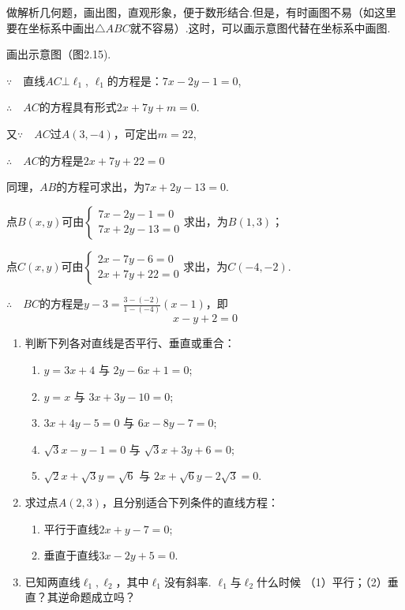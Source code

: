 \begin{analyze}
    做解析几何题，画出图，直观形象，便于数形结合.但是，有时画图不易（如这里要在坐标系中画出$\triangle ABC$就不容易）.这时，可以画示意图代替在坐标系中画图.
\end{analyze}

\begin{solution}
    画出示意图（图2.15).

$\because\quad $直线$AC\bot \ell_1$, $\ell_1$的方程是：$7x-2y-1=0$,

$\therefore\quad AC$的方程具有形式$2x+7y+m=0$.

又$\because\quad AC$过$A(3,-4)$，可定出$m=22$,

$\therefore\quad AC$的方程是$2x+7y+22=0$

同理，$AB$的方程可求出，为$7x+2y-13=0$. 

点$B(x,y)$可由$\begin{cases}
    7x-2y-1=0\\ 7x+2y-13=0
\end{cases}$求出，为$B(1,3)$；

点$C(x,y)$可由$\begin{cases}
    2x-7y-6=0\\ 2x+7y+22=0
\end{cases}$求出，为$C(-4,-2)$.

$\therefore\quad BC$的方程是$y-3=\frac{3-(-2)}{1-(-4)}(x-1)$，即
\[x-y+2=0\]
\end{solution}

\begin{ex}
\begin{enumerate}
    \item 判断下列各对直线是否平行、垂直或重合：
\begin{enumerate}[(1)]
\item $y=3x+4$ 与 $2y-6x+1=0$;
\item $y=x$ 与 $3x+3y-10=0$;
\item $3x+4y-5=0$ 与 $6x-8y-7=0$;
\item $\sqrt{3}x-y-1=0$ 与 $\sqrt{3}x+3y+6=0$;
\item $\sqrt{2}x+\sqrt{3}y=\sqrt{6}$ 与 $2x+\sqrt{6}y-2\sqrt{3}=0$.
\end{enumerate}

    \item 求过点$A(2,3)$，且分别适合下列条件的直线方程：
\begin{enumerate}[(1)]
    \item 平行于直线$2x+y-7=0$;
    \item 垂直于直线$3x-2y+5=0$.
\end{enumerate}
    \item 已知两直线$\ell_1,\ell_2$，其中$\ell_1$没有斜率. $\ell_1$与$\ell_2$什么时候
    （1）平行；（2）垂直？其逆命题成立吗？
\end{enumerate}
\end{ex}

